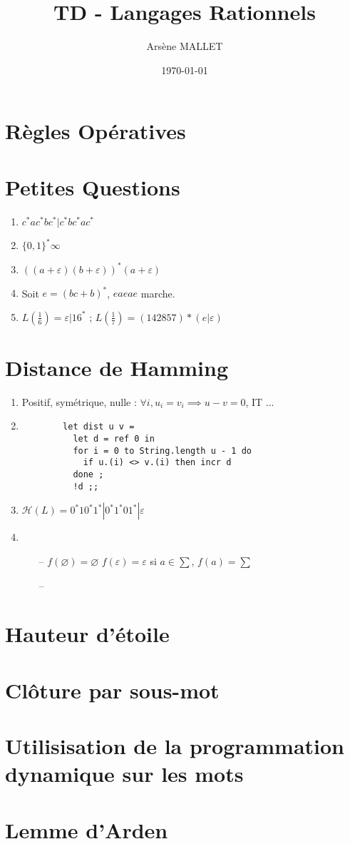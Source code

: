 \documentclass{article}
\title{TD - Langages Rationnels}
\date{\today}
\author{Arsène MALLET}
\begin{document}
\thispagestyle{firstpage}

\begin{center}
    \huge\bfseries{\@title}
\end{center}

\section{R\`egles Op\'eratives}

\section{Petites Questions}

\begin{enumerate}
    \item $c^*ac^*bc^* | c^*bc^*ac^*$
    \item $\{0, 1 \}^* \infty$
    \item $((a + \varepsilon)(b + \varepsilon))^* (a + \varepsilon)$
    \item Soit $e = (bc + b)^*$, $eaeae$ marche.
    \item $L(\frac{1}{6}) = \varepsilon |16^*$ ; $L(\frac{1}{7}) = (142857)*(e|\varepsilon)$
\end{enumerate}

\section{Distance de Hamming}

\begin{enumerate}
    \item Positif, sym\'etrique, nulle : $\forall i, u_i = v_i \implies u - v = 0$, IT ...
    \item \begin{verbatim}
        let dist u v =
          let d = ref 0 in 
          for i = 0 to String.length u - 1 do 
            if u.(i) <> v.(i) then incr d
          done ;
          !d ;;
    \end{verbatim}
    \item $\mathcal{H}(L) = 0^*10^*1^* | 0^*1^*01^* | \varepsilon$ 
    \item \begin{itemize}
        \item[--] $f(\varnothing) = \varnothing$ \newline
            $f(\varepsilon) = \varepsilon$ \newline
            si $a \in \sum$, $f(a) = \sum $
        \item[--]
    \end{itemize}
\end{enumerate}
\section{Hauteur d'\'etoile}

\section{Cl\^oture par sous-mot}

\section{Utilisisation de la programmation dynamique sur les mots}

\section{Lemme d'Arden}
\end{document}
